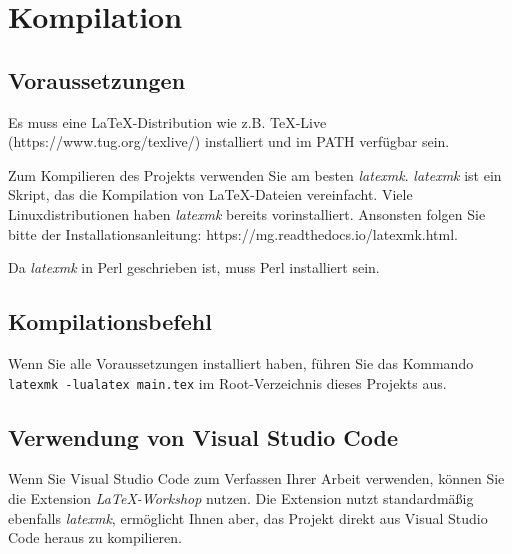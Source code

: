 \section{Kompilation}

\subsection{Voraussetzungen}

Es muss eine \LaTeX-Distribution wie z.B. TeX-Live (https://www.tug.org/texlive/) installiert und im PATH verfügbar sein.

Zum Kompilieren des Projekts verwenden Sie am besten \textit{latexmk}. \textit{latexmk} ist ein Skript, das die Kompilation von \LaTeX-Dateien vereinfacht. Viele Linuxdistributionen haben \textit{latexmk} bereits vorinstalliert. Ansonsten folgen Sie bitte der Installationsanleitung: https://mg.readthedocs.io/latexmk.html.

Da \textit{latexmk} in Perl geschrieben ist, muss Perl installiert sein.

\subsection{Kompilationsbefehl}

Wenn Sie alle Voraussetzungen installiert haben, führen Sie das Kommando \lstinline{latexmk -lualatex main.tex} im Root-Verzeichnis dieses Projekts aus.

\subsection{Verwendung von Visual Studio Code}

Wenn Sie Visual Studio Code zum Verfassen Ihrer Arbeit verwenden, können Sie die Extension \textit{\LaTeX-Workshop} nutzen. Die Extension nutzt standardmäßig ebenfalls \textit{latexmk}, ermöglicht Ihnen aber, das Projekt direkt aus Visual Studio Code heraus zu kompilieren.